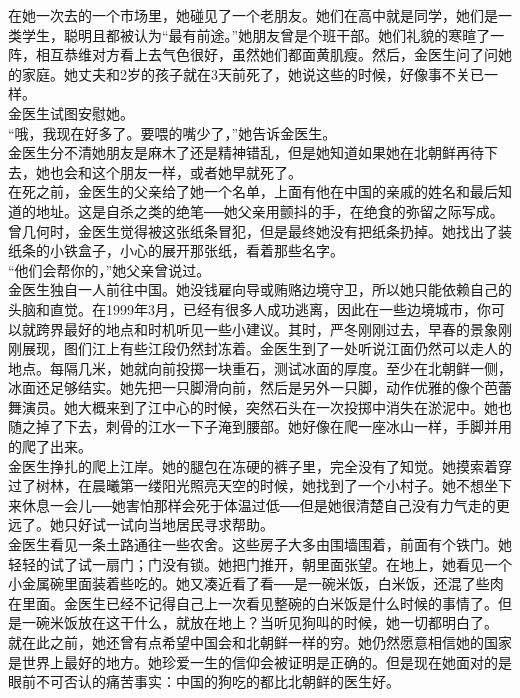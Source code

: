 在她一次去的一个市场里，她碰见了一个老朋友。她们在高中就是同学，她们是一类学生，聪明且都被认为“最有前途。”她朋友曾是个班干部。她们礼貌的寒暄了一阵，相互恭维对方看上去气色很好，虽然她们都面黄肌瘦。然后，金医生问了问她的家庭。她丈夫和2岁的孩子就在3天前死了，她说这些的时候，好像事不关已一样。\\

金医生试图安慰她。\\

“哦，我现在好多了。要喂的嘴少了，”她告诉金医生。\\

金医生分不清她朋友是麻木了还是精神错乱，但是她知道如果她在北朝鲜再待下去，她也会和这个朋友一样，或者她早就死了。\\

在死之前，金医生的父亲给了她一个名单，上面有他在中国的亲戚的姓名和最后知道的地址。这是自杀之类的绝笔──她父亲用颤抖的手，在绝食的弥留之际写成。曾几何时，金医生觉得被这张纸条冒犯，但是最终她没有把纸条扔掉。她找出了装纸条的小铁盒子，小心的展开那张纸，看着那些名字。\\

“他们会帮你的，”她父亲曾说过。\\

金医生独自一人前往中国。她没钱雇向导或贿赂边境守卫，所以她只能依赖自己的头脑和直觉。在1999年3月，已经有很多人成功逃离，因此在一些边境城市，你可以就跨界最好的地点和时机听见一些小建议。其时，严冬刚刚过去，早春的景象刚刚展现，图们江上有些江段仍然封冻着。金医生到了一处听说江面仍然可以走人的地点。每隔几米，她就向前投掷一块重石，测试冰面的厚度。至少在北朝鲜一侧，冰面还足够结实。她先把一只脚滑向前，然后是另外一只脚，动作优雅的像个芭蕾舞演员。她大概来到了江中心的时候，突然石头在一次投掷中消失在淤泥中。她也随之掉了下去，刺骨的江水一下子淹到腰部。她好像在爬一座冰山一样，手脚并用的爬了出来。\\

金医生挣扎的爬上江岸。她的腿包在冻硬的裤子里，完全没有了知觉。她摸索着穿过了树林，在晨曦第一缕阳光照亮天空的时候，她找到了一个小村子。她不想坐下来休息一会儿──她害怕那样会死于体温过低──但是她很清楚自己没有力气走的更远了。她只好试一试向当地居民寻求帮助。\\

金医生看见一条土路通往一些农舍。这些房子大多由围墙围着，前面有个铁门。她轻轻的试了试一扇门；门没有锁。她把门推开，朝里面张望。在地上，她看见一个小金属碗里面装着些吃的。她又凑近看了看──是一碗米饭，白米饭，还混了些肉在里面。金医生已经不记得自己上一次看见整碗的白米饭是什么时候的事情了。但是一碗米饭放在这干什么，就放在地上？当听见狗叫的时候，她一切都明白了。\\

就在此之前，她还曾有点希望中国会和北朝鲜一样的穷。她仍然愿意相信她的国家是世界上最好的地方。她珍爱一生的信仰会被证明是正确的。但是现在她面对的是眼前不可否认的痛苦事实：中国的狗吃的都比北朝鲜的医生好。\\
